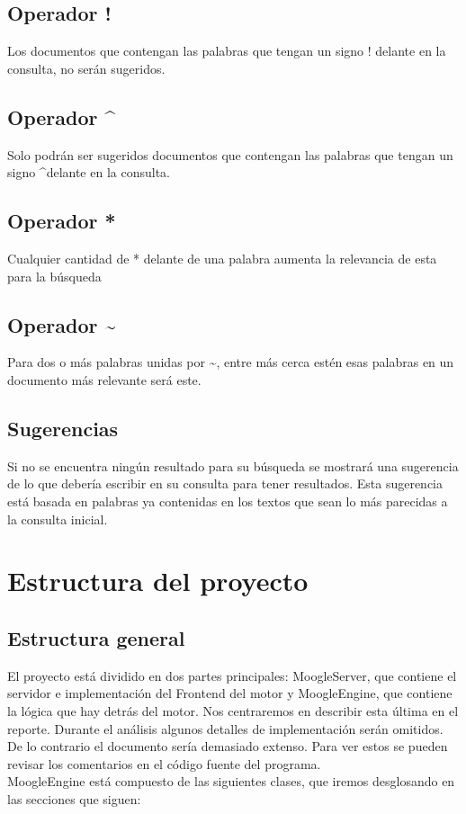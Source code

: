 \documentclass[a4paper,12pt]{article}
\begin{document}
\subsection{Operador !}\label{sub:ignore}
Los documentos que contengan las palabras que tengan un signo ! delante en la consulta, no serán sugeridos.

\subsection{Operador \textasciicircum}\label{sub:force}
Solo podrán ser sugeridos documentos que contengan las palabras que tengan un signo \textasciicircum delante en la consulta.

\subsection{Operador *}\label{sub:increment}
Cualquier cantidad de * delante de una palabra aumenta la relevancia de esta para la búsqueda

\subsection{Operador \textasciitilde}\label{sub:near}
Para dos o más palabras unidas por \textasciitilde, entre más cerca estén esas palabras en un documento más relevante será este.

\subsection{Sugerencias}\label{sub:suggest}
Si no se encuentra ningún resultado para su búsqueda se mostrará una sugerencia de lo que debería escribir en su 
consulta para tener resultados. Esta sugerencia está basada en palabras ya contenidas en los textos que sean lo 
más parecidas a la consulta inicial.

\section{Estructura del proyecto}\label{sec:struct}

\subsection{Estructura general}\label{sub:general-struct}
El proyecto está dividido en dos partes principales: MoogleServer, que contiene el
servidor e implementación del Frontend del motor y MoogleEngine, que contiene la lógica que
hay detrás del motor. Nos centraremos en describir esta última en el reporte.
Durante el análisis algunos detalles de implementación serán omitidos. De lo contrario el
documento sería demasiado extenso. Para ver estos se pueden revisar los comentarios en el
código fuente del programa.
\\
\newline
MoogleEngine está compuesto de las siguientes clases, que iremos desglosando en las
secciones que siguen:
\end{document}

